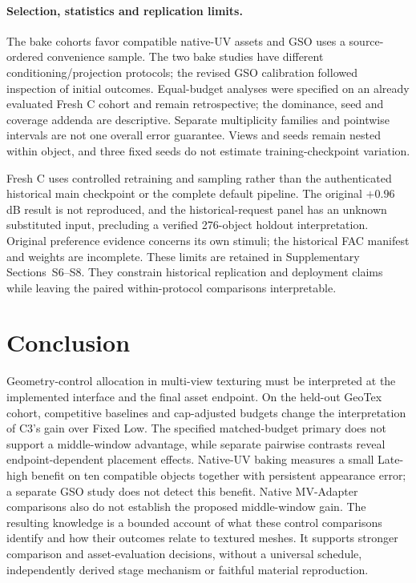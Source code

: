 \documentclass[times,twocolumn,final]{elsarticle}
\begin{document}
\paragraph{Selection, statistics and replication limits.}
The bake cohorts favor compatible native-UV assets and GSO uses a source-ordered convenience sample. The two bake studies have different conditioning/projection protocols; the revised GSO calibration followed inspection of initial outcomes. Equal-budget analyses were specified on an already evaluated Fresh C cohort and remain retrospective; the dominance, seed and coverage addenda are descriptive. Separate multiplicity families and pointwise intervals are not one overall error guarantee. Views and seeds remain nested within object, and three fixed seeds do not estimate training-checkpoint variation.

Fresh C uses controlled retraining and sampling rather than the authenticated historical main checkpoint or the complete default pipeline. The original $+0.96$ dB result is not reproduced, and the historical-request panel has an unknown substituted input, precluding a verified 276-object holdout interpretation. Original preference evidence concerns its own stimuli; the historical FAC manifest and weights are incomplete. These limits are retained in Supplementary Sections~S6--S8. They constrain historical replication and deployment claims while leaving the paired within-protocol comparisons interpretable.

\section{Conclusion}
\label{sec:conclusion}

Geometry-control allocation in multi-view texturing must be interpreted at the implemented interface and the final asset endpoint. On the held-out GeoTex cohort, competitive baselines and cap-adjusted budgets change the interpretation of C3's gain over Fixed Low. The specified matched-budget primary does not support a middle-window advantage, while separate pairwise contrasts reveal endpoint-dependent placement effects. Native-UV baking measures a small Late-high benefit on ten compatible objects together with persistent appearance error; a separate GSO study does not detect this benefit. Native MV-Adapter comparisons also do not establish the proposed middle-window gain. The resulting knowledge is a bounded account of what these control comparisons identify and how their outcomes relate to textured meshes. It supports stronger comparison and asset-evaluation decisions, without a universal schedule, independently derived stage mechanism or faithful material reproduction.
\end{document}
